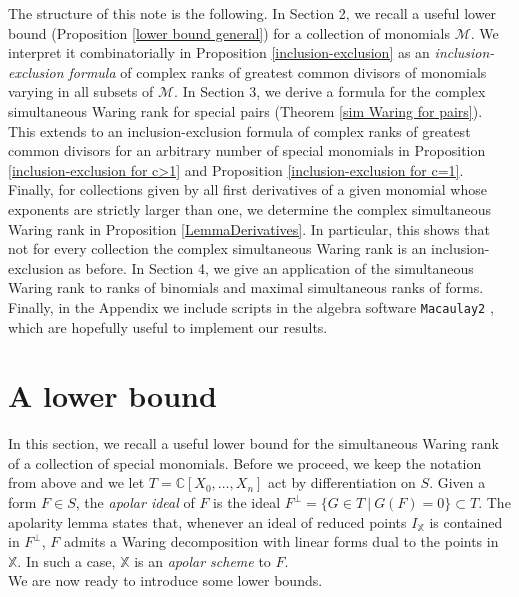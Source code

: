 \documentclass{amsart}
\theoremstyle{plain}
\theoremstyle{definition}
\theoremstyle{remark}
\begin{document}
\indent The structure of this note is the following. In Section 2, we recall a useful lower bound (Proposition \ref{lower bound general}) for a collection of monomials $\mathcal M$. We interpret it combinatorially in Proposition \ref{inclusion-exclusion} as an {\it inclusion-exclusion formula} \cite[Chapter 2]{St} of complex ranks of greatest common divisors of monomials varying in all subsets of $\mathcal M$. In Section 3, we derive a formula for the complex simultaneous Waring rank for special pairs (Theorem \ref{sim Waring for pairs}). This extends to an inclusion-exclusion formula of complex ranks of greatest common divisors for an arbitrary number of special monomials in  Proposition \ref{inclusion-exclusion for c>1} and Proposition \ref{inclusion-exclusion for c=1}. Finally, for collections given by all first derivatives of a given monomial whose exponents are strictly larger than one, we determine the complex simultaneous Waring rank in Proposition \ref{LemmaDerivatives}. In particular, this shows that not for every collection the complex simultaneous Waring rank is an inclusion-exclusion as before. In Section 4, we give an application of the simultaneous Waring rank to ranks of binomials and maximal simultaneous ranks of forms. Finally, in the Appendix we include scripts in the algebra software \texttt{Macaulay2} \cite{M2}, which are hopefully useful to implement our results.



\section{A lower bound}

In this section, we recall a useful lower bound for the simultaneous Waring rank of a collection of special monomials. Before we proceed, we keep the notation from above and we let $T=\mathbb C[X_0,\ldots, X_n]$ act by differentiation on $S$. Given a form $F\in S$,
the {\it apolar ideal} of $F$ is the ideal $F^{\perp} = \lbrace G\in T \ | \ G(F) = 0\rbrace\subset T$. The apolarity lemma \cite[Lemma 1.15]{IK} states that, whenever an ideal of reduced points $I_{\mathbb X}$ is contained in $F^{\perp}$, $F$ admits a Waring decomposition with linear forms dual to the points in $\mathbb X$. In such a case, $\mathbb X$ is an {\it apolar scheme} to $F$. \\
\indent We are now ready to introduce some lower bounds.
\end{document}
